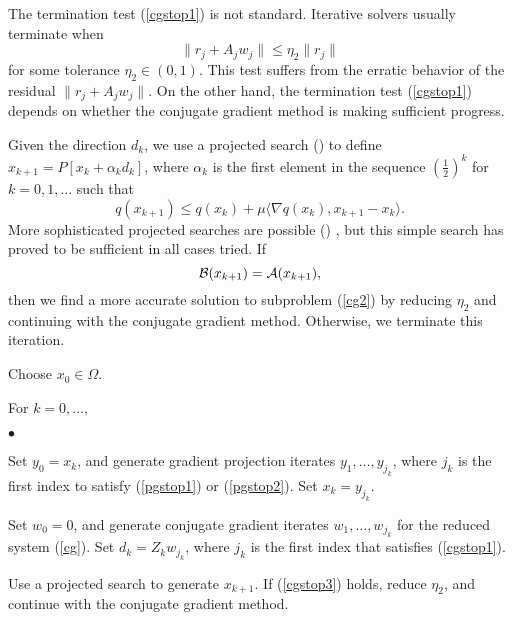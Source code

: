 \documentclass{esub2acm}
\newcommand{\Ref}[1]{\mbox{\rm{(\ref{#1})}}}
\newcommand{\half}{{\textstyle{\frac{1}{2}}}}
\newcommand{\cA} {\mbox{$\cal A$}}
\newcommand{\cB} {\mbox{$\cal B$}}
\begin{document}
The termination test \Ref{cgstop1} is not standard.
Iterative solvers usually terminate when
\[
\| r_j + A_j w_j \| \le \eta_2 \|r_j\| 
\]
for some tolerance $\eta_2 \in (0,1) $.
This test suffers from the erratic behavior
of the residual $ \| r_j + A_j w_j \| $.
On the other hand, the termination test \Ref{cgstop1}
depends on  whether the conjugate gradient method
is making sufficient progress.

Given the direction $ d_k $, we use a projected
search () to define 
$ x_{k+1} = P [ x_k + \alpha_k d_k] $, where
$ \alpha_k $ is the first element in
the sequence $ ( \half ) ^ k $ for $ k = 0, 1, \ldots $ such that
\begin{equation}  \label{cglsstop2}
 q( x_{k+1} ) \le  q(x_k) + \mu
\langle \nabla q(x_k), x_{k+1} - x_k \rangle .
\end{equation}
More sophisticated projected searches are possible ()
,
but this simple search has proved to be sufficient in all cases tried.
If
\begin{equation}
\label{cgstop3}
\cB ( x_{k+1} ) = \cA ( x_{k+1} ) ,
\end{equation}
then we find a more
accurate solution to subproblem \Ref{cg2} by reducing $ \eta_2 $
and continuing with the conjugate gradient method.
Otherwise, we terminate this iteration.

\begin{Algorithm}
\begin{list}{}
{
\setlength{\parsep}{0pt}
\setlength{\itemsep}{0pt}
\setlength{\topsep}{0pt}
}
\item[]
Choose $ x_0 \in \Omega $.
\item[]
For $ k = 0, \ldots, $
\begin{list}{$\bullet$}
{
}
\item[]
Set $y_0 = x_k$, and generate gradient projection iterates
$y_1, \ldots, y_{j_k}$, where $j_k$ is the first index to satisfy
(\ref{pgstop1}) or (\ref{pgstop2}). 
Set $x_k= y_{j_k}$.

\item[]
Set $ w_0 = 0 $, and
generate conjugate gradient iterates $ w_1 , \ldots, w_{j_k} $
for the reduced system (\ref{cg}).
Set $ d _ k = Z_k w _ {j_k} $, where $j_k$ is the first index
that satisfies \Ref {cgstop1}.
\item[]
Use a projected search to generate $ x_{k+1} $.
If \Ref{cgstop3} holds, reduce $\eta_2$, and
continue with the conjugate gradient method.
\end{list}
\end{list}
\end{Algorithm}
\end{document}
